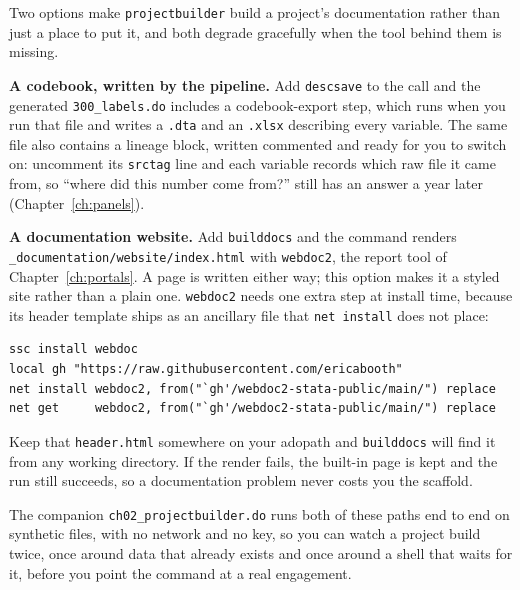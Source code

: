 \documentclass[
    a4paper,
    fontsize=10pt,
    twoside=true,
    numbers=noenddot,
]{kaobook}
\begin{document}
\begin{kaobox}[frametitle=Package Integration: documentation from the scaffold]
Two options make \texttt{projectbuilder} build a project's documentation rather than just a place to put it, and both degrade gracefully when the tool behind them is missing.

\textbf{A codebook, written by the pipeline.} Add \texttt{descsave} to the call and the generated \texttt{300\_labels.do} includes a codebook-export step, which runs when you run that file and writes a \texttt{.dta} and an \texttt{.xlsx} describing every variable. The same file also contains a lineage block, written commented and ready for you to switch on: uncomment its \texttt{srctag} line and each variable records which raw file it came from, so \enquote{where did this number come from?} still has an answer a year later (Chapter~\ref{ch:panels}).

\textbf{A documentation website.} Add \texttt{builddocs} and the command renders \texttt{\_documentation/website/index.html} with \texttt{webdoc2}, the report tool of Chapter~\ref{ch:portals}. A page is written either way; this option makes it a styled site rather than a plain one. \texttt{webdoc2} needs one extra step at install time, because its header template ships as an ancillary file that \texttt{net install} does not place:
\par
{\footnotesize
\begin{verbatim}
ssc install webdoc
local gh "https://raw.githubusercontent.com/ericabooth"
net install webdoc2, from("`gh'/webdoc2-stata-public/main/") replace
net get     webdoc2, from("`gh'/webdoc2-stata-public/main/") replace
\end{verbatim}
}
Keep that \texttt{header.html} somewhere on your adopath and \texttt{builddocs} will find it from any working directory. If the render fails, the built-in page is kept and the run still succeeds, so a documentation problem never costs you the scaffold.
\end{kaobox}

The companion \texttt{ch02\_projectbuilder.do} runs both of these paths end to end on synthetic files, with no network and no key, so you can watch a project build twice, once around data that already exists and once around a shell that waits for it, before you point the command at a real engagement.
\end{document}
